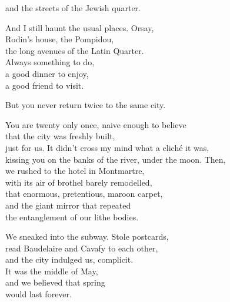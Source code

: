 \documentclass[12pt,twoside]{article}
\begin{document}
\begin{poem}
\begin{stanza}
and the streets of the Jewish quarter.
\end{stanza} 
\begin{stanza}
And I still haunt the usual places. Orsay,\\
Rodin's house, the Pompidou,\\
the long avenues of the Latin Quarter.\\
Always something to do,\\
a good dinner to enjoy,\\
a good friend to visit.
\end{stanza} 
\begin{stanza}
But you never return twice to the same city.
\end{stanza} 
\begin{stanza}
You are twenty only once, naive enough to believe\\
that the city was freshly built,\\
just for us. It didn’t cross my mind what a cliché it was,\\
kissing you on the banks of the river, under the moon. Then,\\
we rushed to the hotel in Montmartre,\\
with its air of brothel barely remodelled,\\
that enormous, pretentious, maroon carpet,\\
and the giant mirror that repeated\\
the entanglement of our lithe bodies.
\end{stanza}
\begin{stanza}
We sneaked into the subway. Stole postcards,\\
read Baudelaire and Cavafy to each other,\\
and the city indulged us, complicit.\\
It was the middle of May,\\
and we believed that spring\\
would last forever.
\end{stanza} 
\end{poem}
\end{document}
